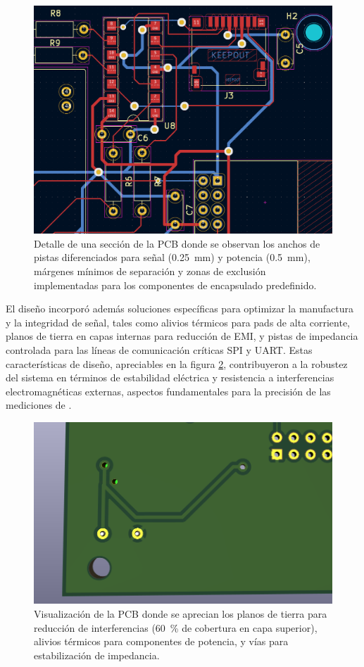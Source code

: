 \begin{figure} [!hbp]
	\centering
	\includegraphics[width=0.7\linewidth]{Figures/PCB_detalle}
	\caption{Detalle de una sección  de la PCB donde se observan los anchos de pistas diferenciados para señal (\SI{0.25}{\milli\meter}) y potencia (\SI{0.5}{\milli\meter}), márgenes mínimos de separación y zonas de exclusión implementadas para los componentes de encapsulado predefinido.}
	\label{fig:pcbdetalle}
\end{figure}

El diseño incorporó además soluciones específicas para optimizar la manufactura y la integridad de señal, tales como alivios térmicos para pads de alta corriente, planos de tierra en capas internas para reducción de EMI, y pistas de impedancia controlada  para las líneas de comunicación críticas SPI y UART. Estas características de diseño, apreciables en la figura \ref{fig:detallepcb3d}, contribuyeron  a la robustez del sistema en términos de estabilidad eléctrica y resistencia a interferencias electromagnéticas externas, aspectos fundamentales para la precisión de las mediciones de \MPF.

\begin{figure} [!hbp]
	\centering
	\includegraphics[width=0.7\linewidth]{Figures/Detalle_PCB_3D}
	\caption{Visualización de la PCB donde se aprecian los planos de tierra para reducción de interferencias (\SI{60}{\percent} de cobertura en capa superior), alivios térmicos para componentes de potencia, y vías  para estabilización de impedancia.}
	\label{fig:detallepcb3d}
\end{figure}



